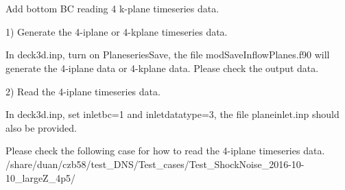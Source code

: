 \documentclass[12pt, oneside]{article}
\begin{document}
\section{}
Add bottom BC reading 4 k-plane timeseries data.

1) Generate the 4-iplane or 4-kplane timeseries data.

In deck3d.inp, turn on PlaneseriesSave, the file modSaveInflowPlanes.f90 will generate the 4-iplane data or 4-kplane data. Please check the output data.    

2) Read the 4-iplane timeseries data.

In deck3d.inp, set inletbc=1 and inletdatatype=3, the file planeinlet.inp should also be provided. 


Please check the following case for how to read the 4-iplane timeseries data.
/share/duan/czb58/test\_DNS/Test\_cases/Test\_ShockNoise\_2016-10-10\_largeZ\_4p5/

\newpage



\end{document}
